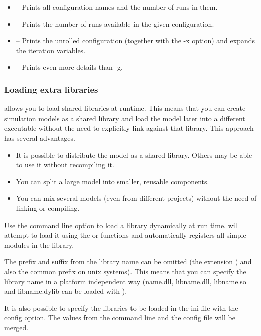 \begin{itemize}
  \item {} -- Prints all configuration names and the number of runs in them.
  \item {} -- Prints the number of runs available in the given configuration.
  \item {} -- Prints the unrolled configuration (together with the -x option) and
                    expands the iteration variables.
  \item {} -- Prints even more details than -g.
\end{itemize}


\subsubsection{Loading extra libraries}

{\opp} allows you to load shared libraries at runtime. This means that you can create
simulation models as a shared library and load the model later into a different executable without
the need to explicitly link against that library. This approach has several advantages.

\begin{itemize}
  \item It is possible to distribute the model as a shared library. Others may be able to use
  it without recompiling it.
  \item You can split a large model into smaller, reusable components.
  \item You can mix several models (even from different projects)
    without the need of linking or compiling.
\end{itemize}

Use the  command line option to load a library dynamically at run time.
{\opp} will attempt to load it using the  or  functions and
automatically registers all simple modules in the library.

The prefix and suffix from the library name can be omitted (the extension ( and also
the common  prefix on unix systems). This means that you can specify the library name in a
platform independent way (name.dll, libname.dll, libname.so and libname.dylib can be loaded with ).

It is also possible to specify the libraries to be loaded in the ini file with the  config option.
The values from the command line and the config file will be merged.

